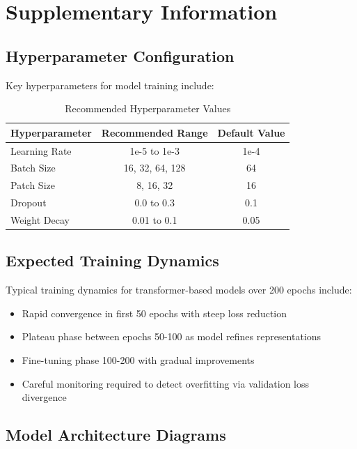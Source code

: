 \documentclass[12pt,a4paper]{article}
\begin{document}
\appendix

\section{Supplementary Information}

\subsection{Hyperparameter Configuration}

Key hyperparameters for model training include:

\begin{table}[H]
\centering
\caption{Recommended Hyperparameter Values}
\begin{tabular}{lcc}
\toprule
\textbf{Hyperparameter} & \textbf{Recommended Range} & \textbf{Default Value} \\
\midrule
Learning Rate & 1e-5 to 1e-3 & 1e-4 \\
Batch Size & 16, 32, 64, 128 & 64 \\
Patch Size & 8, 16, 32 & 16 \\
Dropout & 0.0 to 0.3 & 0.1 \\
Weight Decay & 0.01 to 0.1 & 0.05 \\
\bottomrule
\end{tabular}
\end{table}

\subsection{Expected Training Dynamics}

Typical training dynamics for transformer-based models over 200 epochs include:
\begin{itemize}
    \item Rapid convergence in first 50 epochs with steep loss reduction
    \item Plateau phase between epochs 50-100 as model refines representations
    \item Fine-tuning phase 100-200 with gradual improvements
    \item Careful monitoring required to detect overfitting via validation loss divergence
\end{itemize}

\subsection{Model Architecture Diagrams}
\end{document}
